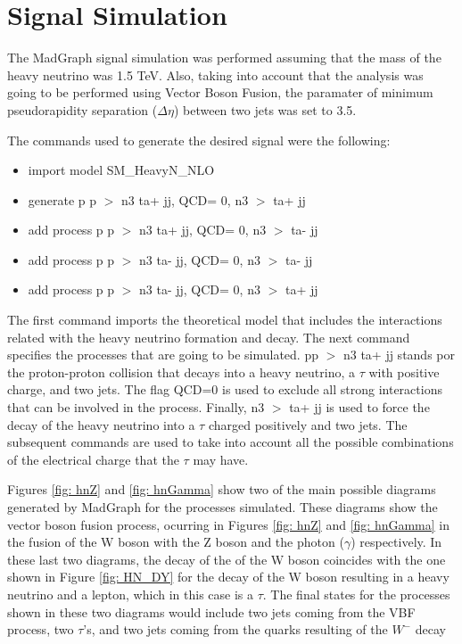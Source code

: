 \chapter{Signal Simulation} \label{sec: mgsim}

The MadGraph signal simulation was performed assuming that the mass of the heavy neutrino was 1.5 TeV. Also, taking into account that the analysis was going to be performed using Vector Boson Fusion, the paramater of minimum pseudorapidity separation ($\Delta \eta$) between two jets was set to 3.5.

The commands used to generate the desired signal were the following:

\begin{itemize}
\item import model SM\_HeavyN\_NLO
\item generate p p $>$ n3 ta+ jj, QCD= 0, n3 $>$ ta+ jj
\item add process p p $>$ n3 ta+ jj, QCD= 0, n3 $>$ ta- jj
\item add process p p $>$ n3 ta- jj, QCD= 0, n3 $>$ ta- jj
\item add process p p $>$ n3 ta- jj, QCD= 0, n3 $>$ ta+ jj

\end{itemize}

The first command imports the theoretical model that includes the interactions related with the heavy neutrino formation and decay. The next command specifies the processes that are going to be simulated. pp $>$ n3 ta+ jj stands por the proton-proton collision that decays into a heavy neutrino, a $\tau$ with positive charge, and two jets. The flag QCD=0 is used to exclude all strong interactions that can be involved in the process. Finally, n3 $>$ ta+ jj is used to force the decay of the heavy neutrino into a $\tau$ charged positively and two jets. The subsequent commands are used to take into account all the possible combinations of the electrical charge that the $\tau$ may have.

Figures \ref{fig: hnZ} and \ref{fig: hnGamma} show two of the main possible diagrams generated by MadGraph for the processes simulated. These diagrams show the vector boson fusion process, ocurring in Figures \ref{fig: hnZ} and \ref{fig: hnGamma} in the fusion of the W boson with the Z boson and the photon ($\gamma$) respectively. In these last two diagrams, the decay of the of the W boson coincides with the one shown in Figure \ref{fig: HN_DY} for the decay of the W boson resulting in a heavy neutrino and a lepton, which in this case is a $\tau$. The final states for the processes shown in these two diagrams would include two jets coming from the VBF process, two $\tau$'s, and two jets coming from the quarks resulting of the $W^{-}$ decay

